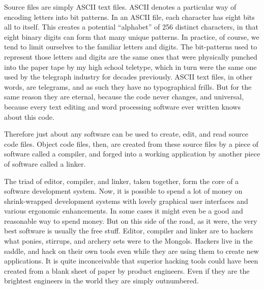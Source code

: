 \documentclass[
  fontsize=11pt,
  paper=landscape,
  twocolumn=true,
  pagesize=pdftex,
  headings=small,
  DIV=15,
  ]{scrartcl}
\begin{document}
Source files are simply ASCII text files. ASCII denotes a particular way
of encoding letters into bit patterns. In an ASCII file, each character
has eight bits all to itself. This creates a potential ``alphabet'' of
256 distinct characters, in that eight binary digits can form that many
unique patterns. In practice, of course, we tend to limit ourselves to
the familiar letters and digits. The bit-patterns used to represent
those letters and digits are the same ones that were physically punched
into the paper tape by my high school teletype, which in turn were the
same one used by the telegraph industry for decades previously. ASCII
text files, in other words, are telegrams, and as such they have no
typographical frills. But for the same reason they are eternal, because
the code never changes, and universal, because every text editing and
word processing software ever written knows about this code.

Therefore just about any software can be used to create, edit, and read
source code files. Object code files, then, are created from these
source files by a piece of software called a compiler, and forged into a
working application by another piece of software called a linker.

The triad of editor, compiler, and linker, taken together, form the core
of a software development system. Now, it is possible to spend a lot of
money on shrink-wrapped development systems with lovely graphical user
interfaces and various ergonomic enhancements. In some cases it might
even be a good and reasonable way to spend money. But on this side of
the road, as it were, the very best software is usually the free stuff.
Editor, compiler and linker are to hackers what ponies, stirrups, and
archery sets were to the Mongols. Hackers live in the saddle, and hack
on their own tools even while they are using them to create new
applications. It is quite inconceivable that superior hacking tools
could have been created from a blank sheet of paper by product
engineers. Even if they are the brightest engineers in the world they
are simply outnumbered.
\end{document}
